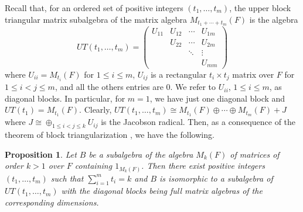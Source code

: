 \documentclass[reqno]{amsart}
\newtheorem{proposition}[theorem]{Proposition}
\theoremstyle{definition}
\numberwithin{equation}{section}
\numberwithin{theorem}{section}
\begin{document}
Recall that, for an ordered set of positive integers $(t_1,\ldots,t_m)$, the upper block triangular matrix subalgebra of the matrix algebra $M_{t_1+\cdots+t_m}(F)$ is the algebra
$$
UT(t_1,\ldots,t_m)=\begin{pmatrix}
    U_{11} & U_{12} & \cdots & U_{1m}\\
   & U_{22} & \cdots & U_{2m}\\
    &  & \ddots   & \vdots\\
     &  &  & U_{mm}
\end{pmatrix}
$$
where $U_{ii}=M_{t_i }(F)$ for $1\leq i \leq m$, $U_{ij}$ is a rectangular $t_i \times t_j$ matrix over $F$ for $1\leq i< j \leq m$, and all the others entries are $0$. We refer to $U_{ii}$, $1\leq i \leq m$, as diagonal blocks. 
In particular, for $m=1$, we have just one diagonal block and $UT(t_1)=M_{t_1}(F)$. Clearly, $UT(t_1,\ldots,t_m)\cong M_{t_1}(F)\oplus \cdots \oplus M_{t_m}(F) + J$ where $J\cong\oplus_{1\leq i<j\leq k}U_{ij}$ is the Jacobson radical. Then, as a consequence of the theorem of block triangularization \cite[Theorem 1.5.1]{RadjaviRosenthalBook}, we have the following.

\begin{proposition}\label{pro: block triangularization}
Let $B$ be a subalgebra of the algebra $M_{k}(F)$ of matrices of order $k>1$ over $F$ containing $1_{M_k(F)}$. Then there exist positive integers $(t_1,\ldots,t_m)$ such that $\sum_{i=1}^m t_i=k$ and  $B$ is isomorphic to a subalgebra of $UT(t_1,\ldots,t_m)$ with the diagonal blocks being full matrix algebras of the corresponding dimensions.
\end{proposition}
\end{document}
